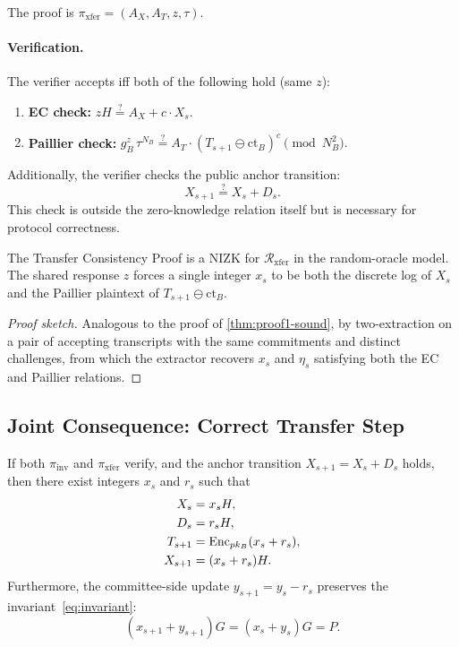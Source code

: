 The proof is $\pi_{\mathrm{xfer}} = (A_X, A_T, z, \tau)$.

\paragraph{Verification.} The verifier accepts iff both of the following hold (same $z$):
\begin{enumerate}
  \item \textbf{EC check:}
  $
  z H \stackrel{?}{=} A_X + c \cdot X_s.
  $
  \item \textbf{Paillier check:}
  $
  g_B^{z}\, \tau^{N_B} \stackrel{?}{=} A_T \cdot (T_{s+1} \ominus \mathrm{ct}_B)^{c} \pmod{N_B^2}.
  $
\end{enumerate}

Additionally, the verifier checks the public anchor transition:
$$
X_{s+1} \stackrel{?}{=} X_s + D_s.
$$
This check is outside the zero-knowledge relation itself but is necessary for protocol correctness.

\begin{theorem}\label{thm:proof2-sound}
The Transfer Consistency Proof is a NIZK for $\mathcal{R}_{\mathrm{xfer}}$ in the random-oracle model. The shared response $z$ forces a single integer $x_s$ to be both the discrete log of $X_s$ and the Paillier plaintext of $T_{s+1} \ominus \mathrm{ct}_B$.
\end{theorem}

\begin{proof}[Proof sketch]
Analogous to the proof of \autoref{thm:proof1-sound}, by two-extraction on a pair of accepting transcripts with the same commitments and distinct challenges, from which the extractor recovers $x_s$ and $\eta_s$ satisfying both the EC and Paillier relations.
\end{proof}


\subsection{Joint Consequence: Correct Transfer Step}\label{sec:joint}

\begin{theorem}\label{thm:correct-step}
If both $\pi_{\mathrm{inv}}$ and $\pi_{\mathrm{xfer}}$ verify, and the anchor transition $X_{s+1} = X_s + D_s$ holds, then there exist integers $x_s$ and $r_s$ such that
\begin{align}
X_s &= x_s H, \label{eq:anchor-open} \\
D_s &= r_s H, \label{eq:delta-open} \\
T_{s+1} &= \mathrm{Enc}_{pk_B}(x_s + r_s), \label{eq:next-ct} \\
X_{s+1} &= (x_s + r_s) H. \label{eq:next-anchor}
\end{align}
Furthermore, the committee-side update $y_{s+1} = y_s - r_s$ preserves the invariant~\eqref{eq:invariant}:
$$
(x_{s+1} + y_{s+1}) G = (x_s + y_s) G = P.
$$
\end{theorem}

